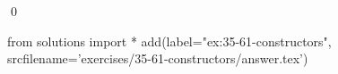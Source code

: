 
\begin{ex}
  \label{ex:35-61-constructors}
  
  \qed
\end{ex}
\begin{python0}
from solutions import *
add(label="ex:35-61-constructors",
    srcfilename='exercises/35-61-constructors/answer.tex')
\end{python0}
